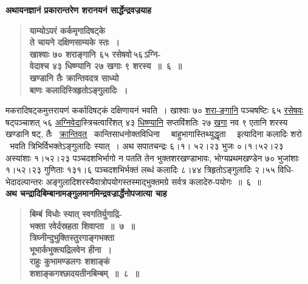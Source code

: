 \documentclass[11pt, openany]{book}
\begin{document}
{\small \textbf{अथायनज्ञानं प्रकारान्तरेण शरानयनं सार्द्धेन्द्रवज्रयाह\textendash }}

\newpage

 \label{4.6}
\begin{quote}
{\large \textbf{{\color{purple}याम्योऽपरं कर्कमृगादिषट्के \\
ते चायने दक्षिणसाम्यके स्तः~। \\
खाश्वाः ७० शराङ्गानि ६५ रसेषवो\textendash \,५६\textendash \,ऽग्नि-\\
वेदाश्च ४३ धिष्ण्यानि २७ खगाः ९ शरस्य~॥~६~॥\\
खण्डानि तैः क्रान्तिवदत्र साध्यो \\
बाणः कलादिस्त्रिहृतोऽङ्गुलादिः~।}}}
\end{quote}

मकरादिषट्कमुत्तरायणं कर्कादिषट्कं दक्षिणायनं भवति~। खाश्वाः ७० \hyperref[4.6]{शरा-ङ्गानि} \;पञ्चषष्टिः \;६५ \;\hyperref[4.6]{रसेषवः} \;षट्पञ्चाशत् \;५६ \;\hyperref[4.6]{अग्निवेदा}स्त्रिचत्वारिंशत् \;४३ \hyperref[4.6]{धिष्ण्यानि} \;सप्तविंशतिः \;२७ \;\hyperref[4.6]{खगा} \;नव \;९ \;एतानि \;शरस्य \;खण्डानि \;षट्, तैः ~\hyperref[4.6]{क्रान्तिवत्} ~कान्तिसाधनोक्तविधिना ~~बाहुभागास्तिथ्युद्धृता ~~इत्यादिना कलादिः शरो ~भवति त्रिभिर्विभक्तेऽङ्गुलादिः स्यात्~। अथ सपातचन्द्रः ६।१। ५२।२३ भुजः ०।१।५२।२३ अस्यांशाः १।५२।२३ पञ्चदशभिर्भागो न पतति तेन भुक्तशरखण्डाभावः, भोग्यप्रथमखण्डेन ७० भुजांशाः १।५२।२३ गुणिताः १३१।६ पञ्चदशभिर्भक्तं लब्धं कलादिः ८।४४ त्रिहृतोऽङ्गुलादिः २।५५ विधि-भेदादल्पान्तरः अङ्गुलादिशरस्यैवात्रोपयोगस्तस्माद्भुक्तमग्रे सर्वत्र कलादेरु-पयोगः~॥~६~॥\\

{\small \textbf{अथ चन्द्रादिबिम्बानामङ्गुलमानमिन्द्रवज्रार्द्धेनोपजात्या चाह\textendash }}

\newpage

 \label{4.8}
\begin{quote}
{\large \textbf{{\color{purple}बिम्बं विधोः स्यात् स्वगतिर्युगाद्रि-\\
भक्ता रवेर्दस्रहता शिवाप्ता~॥~७~॥ \\
त्रिघ्नीन्दुभुक्तिस्तुरगाङ्गभक्ता \\
भूभार्कभुक्त्यद्रिलवेन हीना~। \\
राहुः कुभामण्डलगः शशाङ्कं \\
शशाङ्कगश्छादयतीनबिम्बम्~॥~८~॥}}}
\end{quote}
\end{document}
